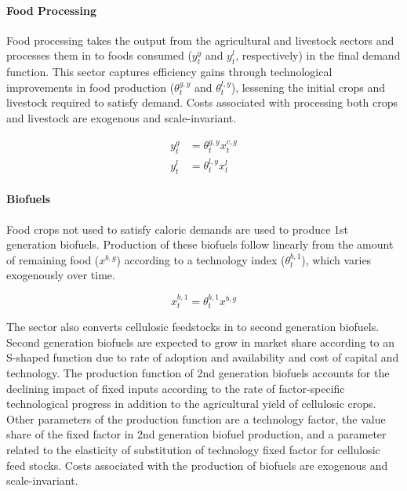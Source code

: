\documentclass[10pt]{article}
\begin{document}
\paragraph{Food Processing}

Food processing takes the output from the agricultural and livestock sectors and processes them in to foods consumed ($y_t^g$ and $y_t^l$, respectively) in the final demand function. This sector captures efficiency gains through technological improvements in food production ($\theta_t^{g,y}$ and $\theta_t^{l,y}$), lessening the initial crops and livestock required to satisfy demand. Costs associated with processing both crops and livestock are exogenous and scale-invariant. 

\begin{subequations}
\begin{align}
y_t^g &= \theta_t^{g,y} x_t^{c,g} \\
y_t^l &= \theta_t^{l,y} x_t^l
\end{align}
\end{subequations}

\paragraph{Biofuels}

Food crops not used to satisfy caloric demands are used to produce 1st generation biofuels. Production of these biofuels follow linearly from the amount of remaining food ($x^{b,g}$) according to a technology index ($\theta_t^{b,1}$), which varies exogenously over time. 

\begin{equation}
x_t^{b,1} = \theta_t^{b,1}x^{b,g}
\end{equation}

The sector also converts cellulosic feedstocks in to second generation biofuels. Second generation biofuels are expected to grow in market share according to an S-shaped function due to rate of adoption and availability and cost of capital and technology. The production function of 2nd generation biofuels accounts for the declining impact of fixed inputs according to the rate of factor-specific technological progress in addition to the agricultural yield of cellulosic crops. Other parameters of the production function are  a technology factor, the value share of the fixed factor in 2nd generation biofuel production, and a parameter related to the elasticity of substitution of technology fixed factor for cellulosic feed stocks. Costs associated with the production of biofuels are exogenous and scale-invariant. 
\end{document}
